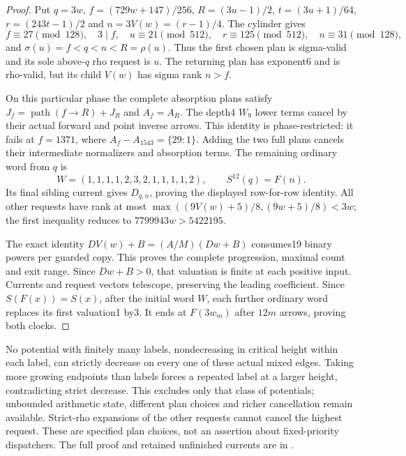\documentclass[11pt]{article}
\begin{document}
\begin{proof}
Put $q=3w$, $f=(729w+147)/256$, $R=(3u-1)/2$,
$t=(3u+1)/64$, $r=(243t-1)/2$ and $n=3V(w)=(r-1)/4$.
The cylinder gives
\[
 f\equiv27\pmod{128},\quad 3\mid f,\quad
 u\equiv21\pmod{512},\quad r\equiv125\pmod{512},
 \quad n\equiv31\pmod{128},
\]
and $\sigma(u)=f<q<n<R=\rho(u)$. Thus the first chosen plan is
sigma-valid and its sole above-$q$ rho request is $u$. The returning
plan has exponent6 and is rho-valid, but its child $V(w)$ has sigma
rank $n>f$.

On this particular phase the complete absorption plans satisfy
$J_f=\operatorname{path}(f\to R)+J_R$ and $A_f=A_R$.
The depth4 $W_9$ lower terms cancel by their actual forward and point
inverse arrows. This identity is phase-restricted: it fails at $f=1371$,
where $A_f-A_{1543}=\{29:1\}$. Adding the two full plans cancels their
intermediate normalizers and absorption terms. The remaining ordinary
word from $q$ is
\[
 W=(1,1,1,1,2,3,2,1,1,1,1,2),\qquad S^{12}(q)=F(n).
\]
Its final sibling current gives $D_{q,n}$, proving the displayed
row-for-row identity. All other requests have rank at most
$\max((9V(w)+5)/8,(9w+5)/8)<3w$; the first inequality reduces to
$7799943w>5422195$.

The exact identity $DV(w)+B=(A/M)(Dw+B)$ consumes19 binary powers
per guarded copy. This proves the complete progression, maximal count
and exit range. Since $Dw+B>0$, that valuation is finite at each
positive input. Currents and request vectors telescope, preserving
the leading coefficient. Since $S(F(x))=S(x)$, after the initial word
$W$, each further ordinary word replaces its first valuation1 by3.
It ends at $F(3w_m)$ after $12m$ arrows, proving both clocks.
\end{proof}

No potential with finitely many labels, nondecreasing in critical height
within each label, can strictly decrease on every one of these actual
mixed edges. Taking more growing endpoints than labels forces a repeated
label at a larger height, contradicting strict decrease. This excludes
only that class of potentials; unbounded arithmetic state, different
plan choices and richer cancellation remain available. Strict-rho
expansions of the other requests cannot cancel the highest request.
These are specified plan choices, not an assertion about fixed-priority
dispatchers. The full proof and retained unfinished currents are in
.
\end{document}
